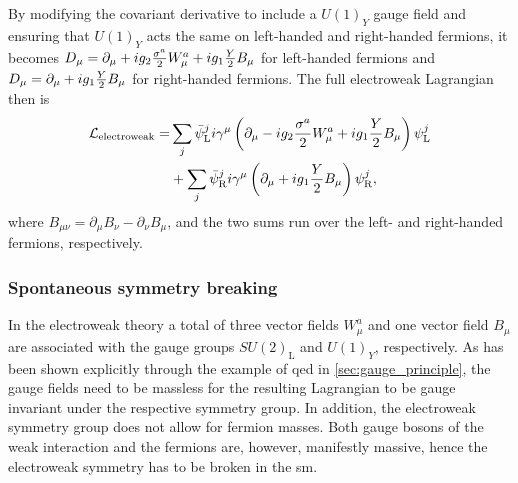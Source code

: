 By modifying the covariant derivative to include a $U(1)_Y$ gauge field and ensuring that $U(1)_Y$ acts the same on left-handed and right-handed fermions, it becomes $\mathop{}\!D_\mu = \partial_\mu + ig_2\frac{\sigma^a}{2}W^a_\mu + ig_1\frac{Y}{2}B_\mu$ for left-handed fermions and $\mathop{}\!D_\mu = \partial_\mu + ig_1\frac{Y}{2}B_\mu$ for right-handed fermions. The full electroweak Lagrangian then is
\begin{equation}
\begin{split}
	\mathcal{L}_\mathrm{electroweak} = & \sum_j{\bar{\psi}_\mathrm{L}^j i \gamma^\mu \left(\partial_\mu -ig_2\frac{\sigma^a}{2} W^a_\mu + ig_1 \frac{Y}{2} B_\mu \right) \psi^j_\mathrm{L}} \\
	& + \sum_j{\bar{\psi}_\mathrm{R}^j i \gamma^\mu \left(\partial_\mu + ig_1 \frac{Y}{2} B_\mu \right) \psi^j_\mathrm{R}}, 
\end{split}
\end{equation}
where $B_{\mu\nu} = \partial_\mu B_\nu - \partial_\nu B_\mu$, and the two sums run over the left- and right-handed fermions, respectively.

\subsubsection{Spontaneous symmetry breaking}
\label{sec:ssb}

In the electroweak theory a total of three vector fields $W^a_\mu$ and one vector field $B_\mu$ are associated with the gauge groups $SU(2)_\mathrm{L}$ and $U(1)_Y$, respectively. As has been shown explicitly through the example of \gls{qed} in \cref{sec:gauge_principle}, the gauge fields need to be massless for the resulting Lagrangian to be gauge invariant under the respective symmetry group. In addition, the electroweak symmetry group does not allow for fermion masses. Both gauge bosons of the weak interaction and the fermions are, however, manifestly massive, hence the electroweak symmetry has to be broken in the \gls{sm}.

